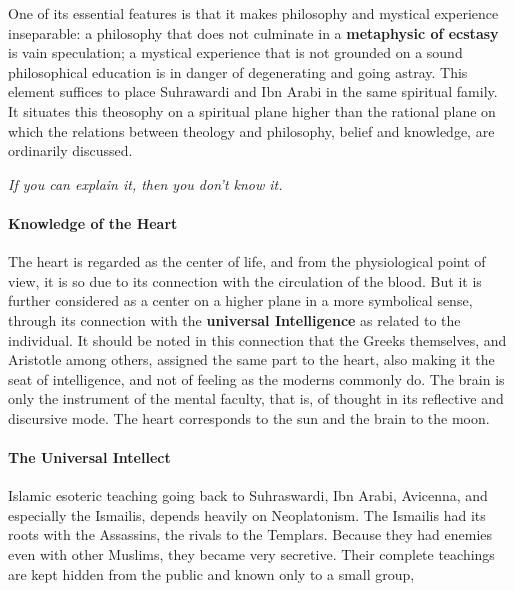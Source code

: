 \begin{quotex}
One of its essential features is that it makes philosophy and mystical experience inseparable: a philosophy that does
not culminate in a \textbf{metaphysic of ecstasy} is vain speculation; a mystical experience that is not grounded on a
sound philosophical education is in danger of degenerating and going astray. This element suffices to place Suhrawardi
and Ibn Arabi in the same spiritual family. It situates this theosophy on a spiritual plane higher than the rational
plane on which the relations between theology and philosophy, belief and knowledge, are ordinarily discussed. 

\end{quotex}
\emph{If you can explain it, then you don't know it.}

\paragraph{Knowledge of the Heart}
\begin{quotex}
The heart is regarded as the center of life, and from the physiological point of view, it is so due to its connection
with the circulation of the blood. But it is further considered as a center on a higher plane in a more symbolical
sense, through its connection with the \textbf{universal Intelligence} as related to the individual. It should be noted
in this connection that the Greeks themselves, and Aristotle among others, assigned the same part to the heart, also
making it the seat of intelligence, and not of feeling as the moderns commonly do. The brain is only the instrument of
the mental faculty, that is, of thought in its reflective and discursive mode. The heart corresponds to the sun and the
brain to the moon. 

\end{quotex}
\paragraph{The Universal Intellect}
Islamic esoteric teaching going back to Suhraswardi, Ibn Arabi, Avicenna, and especially the Ismailis, depends heavily
on Neoplatonism. The Ismailis had its roots with the Assassins, the rivals to the Templars. Because they had enemies
even with other Muslims, they became very secretive. Their complete teachings are kept hidden from the public and known
only to a small group,

